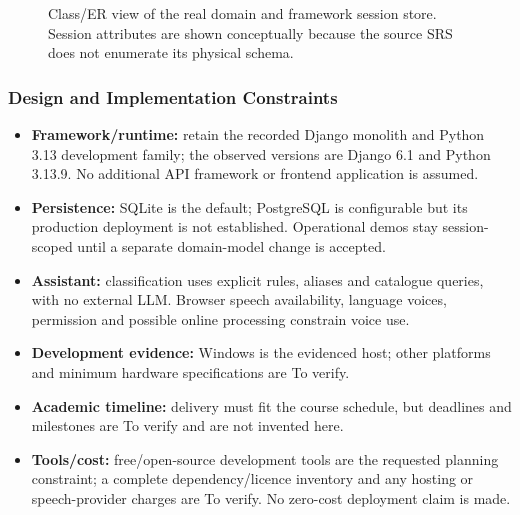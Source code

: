 \begin{figure}[H]
\caption{Class/ER view of the real domain and framework session store. Session attributes are shown conceptually because the source SRS does not enumerate its physical schema.}\label{fig:er}
\end{figure}
\subsubsection{Design and Implementation Constraints}
\begin{itemize}
\item \textbf{Framework/runtime:} retain the recorded Django monolith and Python 3.13 development family; the observed versions are Django 6.1 and Python 3.13.9. No additional API framework or frontend application is assumed.
\item \textbf{Persistence:} SQLite is the default; PostgreSQL is configurable but its production deployment is not established. Operational demos stay session-scoped until a separate domain-model change is accepted.
\item \textbf{Assistant:} classification uses explicit rules, aliases and catalogue queries, with no external LLM. Browser speech availability, language voices, permission and possible online processing constrain voice use.
\item \textbf{Development evidence:} Windows is the evidenced host; other platforms and minimum hardware specifications are To verify.
\item \textbf{Academic timeline:} delivery must fit the course schedule, but deadlines and milestones are To verify and are not invented here.
\item \textbf{Tools/cost:} free/open-source development tools are the requested planning constraint; a complete dependency/licence inventory and any hosting or speech-provider charges are To verify. No zero-cost deployment claim is made.
\end{itemize}

